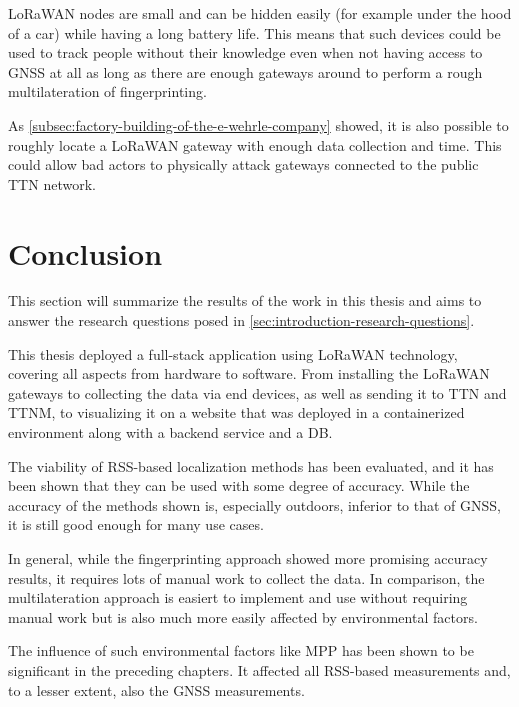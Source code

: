 \ac{LoRaWAN} nodes are small and can be hidden easily (for example under the hood of a car) while having a long battery life.
This means that such devices could be used to track people without their knowledge even when not having access to \ac{GNSS} at all as long as there are enough gateways around to perform a rough multilateration of fingerprinting.

As \cref{subsec:factory-building-of-the-e-wehrle-company} showed, it is also possible to roughly locate a \ac{LoRaWAN} gateway with enough data collection and time.
This could allow bad actors to physically attack gateways connected to the public \ac{TTN} network.

\section{Conclusion}

This section will summarize the results of the work in this thesis and aims to answer the research questions posed in \cref{sec:introduction-research-questions}.

This thesis deployed a full-stack application using \ac{LoRaWAN} technology, covering all aspects from hardware to software.
From installing the \ac{LoRaWAN} gateways to collecting the data via end devices, as well as sending it to \ac{TTN} and \ac{TTNM}, to visualizing it on a website that was deployed in a containerized environment along with a backend service and a \ac{DB}.

The viability of \ac{RSS}-based localization methods has been evaluated, and it has been shown that they can be used with some degree of accuracy.
While the accuracy of the methods shown is, especially outdoors, inferior to that of \ac{GNSS}, it is still good enough for many use cases.

In general, while the fingerprinting approach showed more promising accuracy results, it requires lots of manual work to collect the data.
In comparison, the multilateration approach is easiert to implement and use without requiring manual work but is also much more easily affected by environmental factors.

The influence of such environmental factors like \ac{MPP} has been shown to be significant in the preceding chapters.
It affected all \ac{RSS}-based measurements and, to a lesser extent, also the \ac{GNSS} measurements.